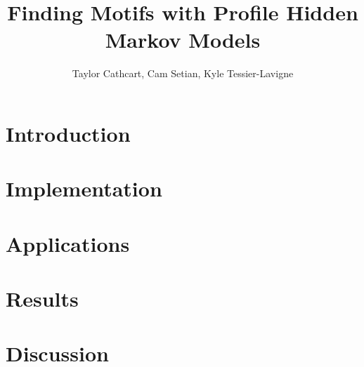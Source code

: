\documentclass{article}
\title{Finding Motifs with Profile Hidden Markov Models}
\author{Taylor Cathcart, Cam Setian, Kyle Tessier-Lavigne}
\begin{document}
\maketitle

\section{Introduction}

\section{Implementation}

\section{Applications}

\section{Results}

\section{Discussion}



\end{document}
